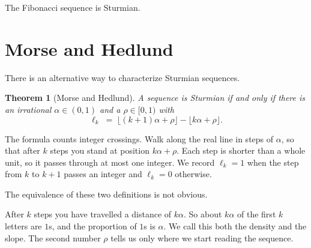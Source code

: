 \documentclass[11pt,a4paper]{article}
\theoremstyle{definition}
\theoremstyle{plain}
\newtheorem{theorem}[definition]{Theorem}
\begin{document}
The Fibonacci sequence is Sturmian.


\clearpage
\section{Morse and Hedlund}

There is an alternative way to characterize Sturmian sequences.

\begin{center}
\colorbox{black!8}{%
\begin{minipage}{0.93\textwidth}
\begin{theorem}[Morse and Hedlund]
A sequence is Sturmian if and only if there is an irrational $\alpha \in (0,1)$
and a $\rho \in [0,1)$ with
\[
  \ell_k \;=\; \lfloor (k+1)\alpha + \rho \rfloor - \lfloor k\alpha + \rho \rfloor .
\]
\end{theorem}
\end{minipage}}
\end{center}

The formula counts integer crossings. Walk along the real line in steps of
$\alpha$, so that after $k$ steps you stand at position $k\alpha + \rho$. Each step is shorter than a
whole unit, so it passes through at most one integer. We record $\ell_k = 1$ when the
step from $k$ to $k+1$ passes an integer and $\ell_k = 0$ otherwise.

The equivalence of these two definitions is not obvious.

After $k$ steps you have travelled a distance of $k\alpha$. So about $k\alpha$
of the first $k$ letters are $1$s, and the proportion of $1$s is $\alpha$. We call this
both the density and the slope. The second number $\rho$ tells us only where
we start reading the sequence.
\end{document}
